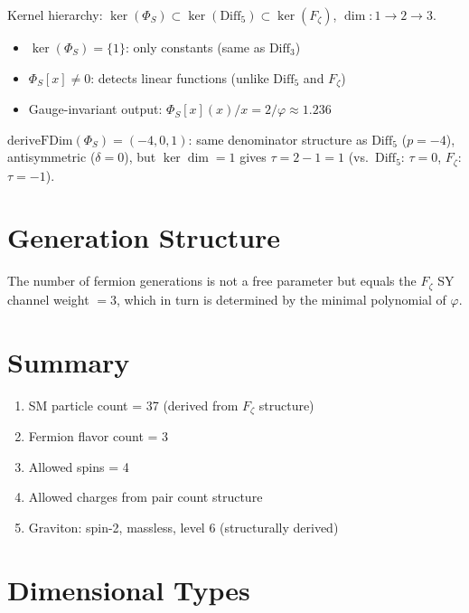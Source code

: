 Kernel hierarchy:
$\ker(\Phi_S) \subset \ker(\mathrm{Diff}_5) \subset \ker(F_\zeta)$, \quad $\dim: 1 \to 2 \to 3$.
\begin{itemize}
\item $\ker(\Phi_S) = \{1\}$: only constants (same as $\mathrm{Diff}_3$)
\item $\Phi_S[x] \neq 0$: detects linear functions (unlike $\mathrm{Diff}_5$ and $F_\zeta$)
\item Gauge-invariant output: $\Phi_S[x](x)/x = 2/\varphi \approx 1.236$
\end{itemize}

$\mathrm{deriveFDim}(\Phi_S) = (-4, 0, 1)$:
same denominator structure as $\mathrm{Diff}_5$ ($p = -4$), antisymmetric ($\delta = 0$),
but $\ker\dim = 1$ gives $\tau = 2 - 1 = 1$ (vs.\ $\mathrm{Diff}_5$: $\tau = 0$, $F_\zeta$: $\tau = -1$).

\section{Generation Structure}
\label{sec:generation_structure}

The number of fermion generations is not a free parameter but equals
the $F_\zeta$ SY channel weight $= 3$, which in turn is determined
by the minimal polynomial of $\varphi$.

\section{Summary}
\label{sec:particle_summary}

\begin{theorem}
\label{thm:particle_summary}
\leanok
\begin{enumerate}
\item SM particle count = 37 (derived from $F_\zeta$ structure)
\item Fermion flavor count = 3
\item Allowed spins = 4
\item Allowed charges from pair count structure
\item Graviton: spin-2, massless, level 6 (structurally derived)
\end{enumerate}
\end{theorem}

\section{Dimensional Types}
\label{sec:particle_dim}

